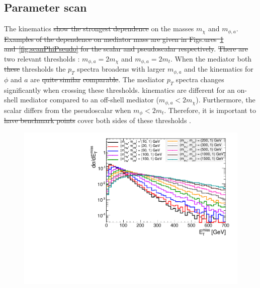 \subsection{Parameter scan}
The kinematics \sout{show the strongest dependence}  on the masses $m_{\chi}$ and $m_{\phi,a}$. 
\sout{Examples of the dependence on mediator mass are given in Figs.\sout{ures}~\ref{fig:scanPhi} and~\ref{fig:scanPhiPseudo} for the scalar and pseudoscalar respectively}.\sout{ There are}  two relevant thresholds : $m_{\phi,a} = 2m_{\chi}$ and $m_{\phi,a} = 2m_t$. When the mediator  both \sout{these} thresholds  the $p_{T}$ spectra broadens with larger $m_{\phi,a}$ and the kinematics for $\phi$ and $a$ are \sout{quite similar} \sout{comparable}. The mediator $p_{T}$ spectra changes significantly when crossing these thresholds.   kinematics are different for an on-shell mediator compared to an off-shell mediator ($m_{\phi,a}<2m_{\chi}$). Furthermore, the scalar  differs from the pseudoscalar  when $m_{\phi}<2m_t$. Therefore, it is important to \sout{have benchmark points } cover both sides of these thresholds .

\begin{figure}[!ht]
  \begin{center}
    \includegraphics[scale=0.45]{figures/MEt_chi1.pdf}
    \vspace{2mm}
    \caption{\label{fig:scanPhi} 
    }
\end{center}
\end{figure}


